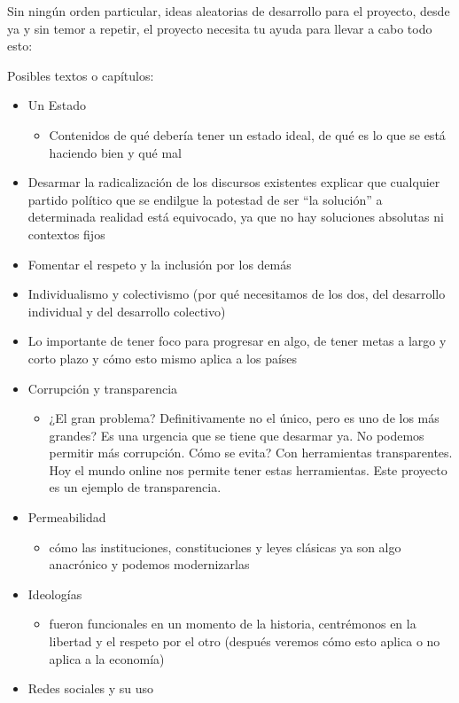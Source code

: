 \documentclass[
]{book}
\providecommand{\tightlist}{%
  \setlength{\itemsep}{0pt}\setlength{\parskip}{0pt}}
\begin{document}
Sin ningún orden particular, ideas aleatorias de desarrollo para el proyecto, desde ya y sin temor a repetir, el proyecto necesita tu ayuda para llevar a cabo todo esto:

Posibles textos o capítulos:

\begin{itemize}
\tightlist
\item
  Un Estado

  \begin{itemize}
  \tightlist
  \item
    Contenidos de qué debería tener un estado ideal, de qué es lo que se está haciendo bien y qué mal
  \end{itemize}
\item
  Desarmar la radicalización de los discursos existentes explicar que cualquier partido político que se endilgue la potestad de ser ``la solución'' a determinada realidad está equivocado, ya que no hay soluciones absolutas ni contextos fijos
\item
  Fomentar el respeto y la inclusión por los demás
\item
  Individualismo y colectivismo (por qué necesitamos de los dos, del desarrollo individual y del desarrollo colectivo)
\item
  Lo importante de tener foco para progresar en algo, de tener metas a largo y corto plazo y cómo esto mismo aplica a los países
\item
  Corrupción y transparencia

  \begin{itemize}
  \tightlist
  \item
    ¿El gran problema? Definitivamente no el único, pero es uno de los más grandes? Es una urgencia que se tiene que desarmar ya. No podemos permitir más corrupción. Cómo se evita? Con herramientas transparentes. Hoy el mundo online nos permite tener estas herramientas. Este proyecto es un ejemplo de transparencia.
  \end{itemize}
\item
  Permeabilidad

  \begin{itemize}
  \tightlist
  \item
    cómo las instituciones, constituciones y leyes clásicas ya son algo anacrónico y podemos modernizarlas
  \end{itemize}
\item
  Ideologías

  \begin{itemize}
  \tightlist
  \item
    fueron funcionales en un momento de la historia, centrémonos en la libertad y el respeto por el otro (después veremos cómo esto aplica o no aplica a la economía)
  \end{itemize}
\item
  Redes sociales y su uso


\end{itemize}
\end{document}
